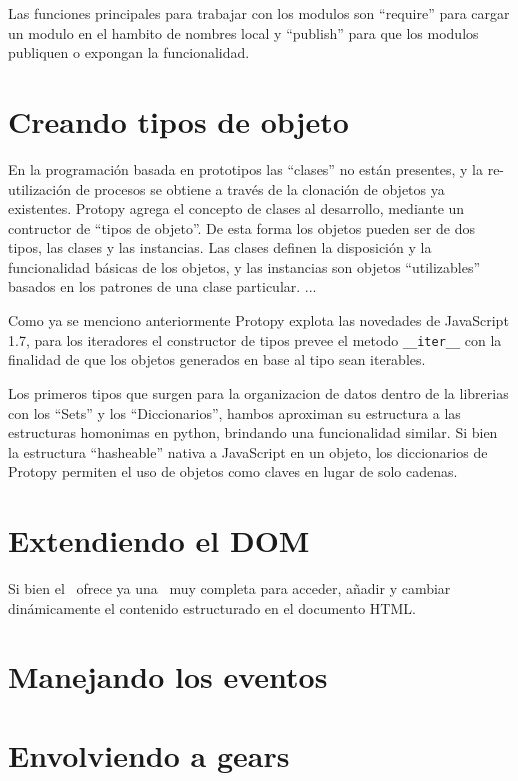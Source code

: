 Las funciones principales para trabajar con los modulos son ``require'' para
cargar un modulo en el hambito de nombres local y ``publish'' para que los
modulos publiquen o expongan la funcionalidad.

\section{Creando tipos de objeto}
En la programación basada en prototipos las ``clases'' no están presentes, y la
re-utilización de procesos se obtiene a través de la clonación de objetos ya
existentes.
Protopy agrega el concepto de clases al desarrollo, mediante un contructor de
``tipos de objeto''. De esta forma los objetos pueden ser de dos tipos, las
clases y las instancias. Las clases definen la disposición y la funcionalidad
básicas de los objetos, y las instancias son objetos ``utilizables'' basados en
los patrones de una clase particular.
...

Como ya se menciono anteriormente Protopy explota las novedades de JavaScript
1.7, para los iteradores el constructor de tipos prevee el metodo
\verb|__iter__| con la finalidad de que los objetos generados en base al tipo
sean iterables.

Los primeros tipos que surgen para la organizacion de datos dentro de la
librerias con los ``Sets'' y los ``Diccionarios'', hambos aproximan su
estructura a las estructuras homonimas en python, brindando una funcionalidad
similar. Si bien la estructura ``hasheable'' nativa a JavaScript en un objeto,
los diccionarios de Protopy permiten el uso de objetos como claves en lugar de
solo cadenas.

\section{Extendiendo el DOM}
Si bien el \DOM\ ofrece ya una \API\ muy completa para acceder, añadir y cambiar
dinámicamente el contenido estructurado en el documento HTML.

\section{Manejando los eventos}

\section{Envolviendo a gears}

